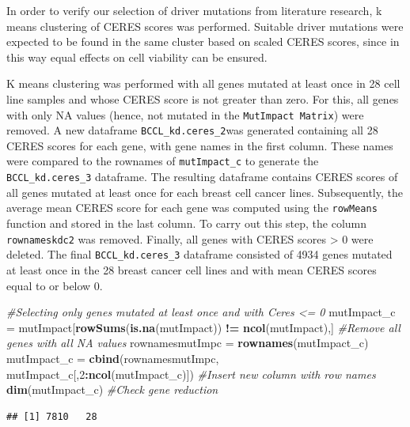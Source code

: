 \documentclass[]{article}
\newenvironment{Shaded}{\begin{snugshade}}{\end{snugshade}}
\newcommand{\CommentTok}[1]{\textcolor[rgb]{0.56,0.35,0.01}{\textit{#1}}}
\newcommand{\DecValTok}[1]{\textcolor[rgb]{0.00,0.00,0.81}{#1}}
\newcommand{\KeywordTok}[1]{\textcolor[rgb]{0.13,0.29,0.53}{\textbf{#1}}}
\newcommand{\NormalTok}[1]{#1}
\newcommand{\OperatorTok}[1]{\textcolor[rgb]{0.81,0.36,0.00}{\textbf{#1}}}
\newcommand{\StringTok}[1]{\textcolor[rgb]{0.31,0.60,0.02}{#1}}
\begin{document}
In order to verify our selection of driver mutations from literature
research, k means clustering of CERES scores was performed. Suitable
driver mutations were expected to be found in the same cluster based on
scaled CERES scores, since in this way equal effects on cell viability
can be ensured.

K means clustering was performed with all genes mutated at least once in
28 cell line samples and whose CERES score is not greater than zero. For
this, all genes with only NA values (hence, not mutated in the
\texttt{MutImpact\ Matrix}) were removed. A new dataframe
\texttt{BCCL\_kd.ceres\_2}was generated containing all 28 CERES scores
for each gene, with gene names in the first column. These names were
compared to the rownames of \texttt{mutImpact\_c} to generate the
\texttt{BCCL\_kd.ceres\_3} dataframe. The resulting dataframe contains
CERES scores of all genes mutated at least once for each breast cell
cancer lines. Subsequently, the average mean CERES score for each gene
was computed using the \texttt{rowMeans} function and stored in the last
column. To carry out this step, the column \texttt{rownameskdc2} was
removed. Finally, all genes with CERES scores \textgreater{} 0 were
deleted. The final \texttt{BCCL\_kd.ceres\_3} dataframe consisted of
4934 genes mutated at least once in the 28 breast cancer cell lines and
with mean CERES scores equal to or below 0.

\begin{Shaded}
\begin{Highlighting}[]
\CommentTok{#Selecting only genes mutated at least once and with Ceres <= 0}
\NormalTok{mutImpact_c =}\StringTok{ }\NormalTok{mutImpact[}\KeywordTok{rowSums}\NormalTok{(}\KeywordTok{is.na}\NormalTok{(mutImpact)) }\OperatorTok{!=}\StringTok{ }\KeywordTok{ncol}\NormalTok{(mutImpact),] }\CommentTok{#Remove all genes with all NA values}
\NormalTok{rownamesmutImpc =}\StringTok{ }\KeywordTok{rownames}\NormalTok{(mutImpact_c)}
\NormalTok{mutImpact_c =}\StringTok{ }\KeywordTok{cbind}\NormalTok{(rownamesmutImpc, mutImpact_c[,}\DecValTok{2}\OperatorTok{:}\KeywordTok{ncol}\NormalTok{(mutImpact_c)]) }\CommentTok{#Insert new column with row names}
\KeywordTok{dim}\NormalTok{(mutImpact_c) }\CommentTok{#Check gene reduction }
\end{Highlighting}
\end{Shaded}

\begin{verbatim}
## [1] 7810   28
\end{verbatim}
\end{document}
